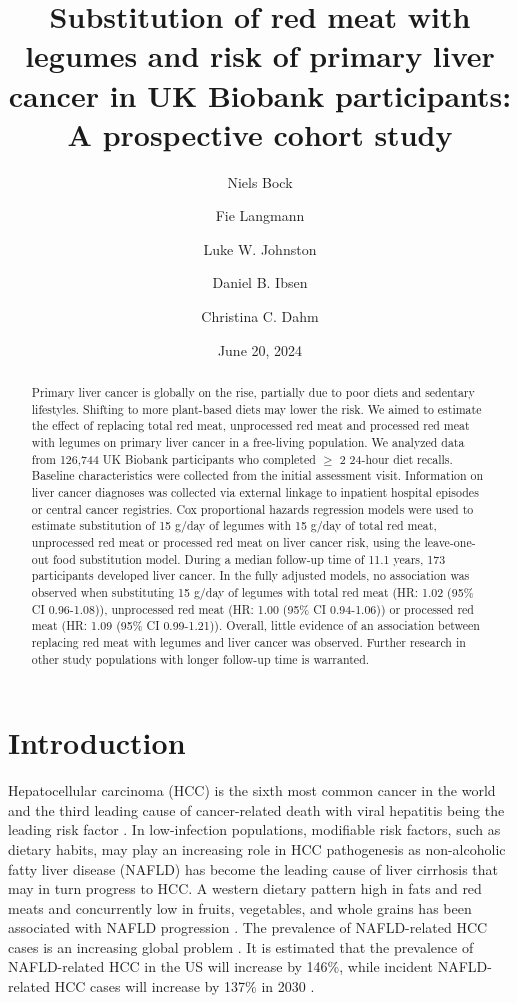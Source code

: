 \documentclass[
]{article}
\title{Substitution of red meat with legumes and risk of primary liver cancer in UK Biobank participants: A prospective cohort study}
\author[1]{Niels Bock \orcidlink{0009-0005-7373-1589}}
\author[1]{Fie Langmann \orcidlink{0000-0003-3474-9346}}
\author[1,2]{Luke W. Johnston \orcidlink{0000-0003-4169-2616}}
\author[1,2]{Daniel B. Ibsen \orcidlink{0000-0002-7038-4770}}
\author[1]{Christina C. Dahm \orcidlink{0000-0003-0481-2893}}
\affil[1]{Department of Public Health, Aarhus University, Aarhus, Denmark}
\affil[2]{Steno Diabetes Center Aarhus, Aarhus University Hospital, Aarhus N, Denmark}
\date{June 20, 2024}
\begin{document}
\maketitle
\begin{abstract}
\noindent Primary liver cancer is globally on the rise, partially due to poor diets and
sedentary lifestyles. Shifting to more plant-based diets may lower the risk.
We aimed to estimate the effect of replacing total red meat, unprocessed red
meat and processed red meat with legumes on primary liver cancer in a
free-living population. We analyzed data from 126,744 UK Biobank participants
who completed \(\geq\) 2 24-hour diet recalls. Baseline characteristics were
collected from the initial assessment visit. Information on liver cancer
diagnoses was collected via external linkage to inpatient hospital episodes or
central cancer registries. Cox proportional hazards regression models were
used to estimate substitution of 15 g/day of legumes with 15 g/day of total
red meat, unprocessed red meat or processed red meat on liver cancer risk,
using the leave-one-out food substitution model. During a median follow-up
time of 11.1 years, 173 participants developed liver cancer. In the fully
adjusted models, no association was observed when substituting 15 g/day of
legumes with total red meat (HR: 1.02 (95\% CI 0.96-1.08)), unprocessed red
meat (HR: 1.00 (95\% CI 0.94-1.06)) or processed red meat (HR: 1.09 (95\% CI
0.99-1.21)). Overall, little evidence of an association between replacing red
meat with legumes and liver cancer was observed. Further research in other
study populations with longer follow-up time is warranted.
\end{abstract}

\twocolumn

\hypertarget{sec1}{%
\section{Introduction}\label{sec1}}

Hepatocellular carcinoma (HCC) is the sixth most common cancer in the
world and the third leading cause of cancer-related death with viral
hepatitis being the leading risk factor \autocite{Massarweh2017}. In
low-infection populations, modifiable risk factors, such as dietary
habits, may play an increasing role in HCC pathogenesis as non-alcoholic
fatty liver disease (NAFLD) has become the leading cause of liver
cirrhosis \autocite{Younossi2016,Younossi2020} that may in turn progress to
HCC. A western dietary pattern high in fats and red meats and
concurrently low in fruits, vegetables, and whole grains has been
associated with NAFLD progression \autocite{Guo2022}. The prevalence of
NAFLD-related HCC cases is an increasing global problem \autocite{Younossi2016}.
It is estimated that the prevalence of NAFLD-related HCC in the US will
increase by 146\%, while incident NAFLD-related HCC cases will increase
by 137\% in 2030 \autocite{Estes2018}.
\end{document}
